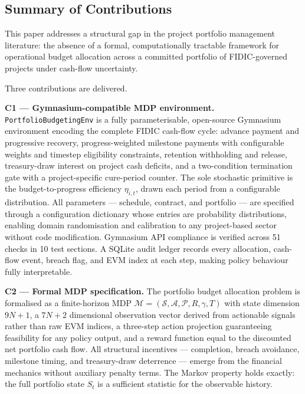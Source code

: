 \subsection{Summary of Contributions}
\label{subsec:summary}

This paper addresses a structural gap in the project portfolio
management literature: the absence of a formal, computationally
tractable framework for operational budget allocation across a
committed portfolio of FIDIC-governed projects under cash-flow
uncertainty.

Three contributions are delivered.

\textbf{C1 --- Gymnasium-compatible MDP environment.}
\texttt{PortfolioBudgetingEnv} is a fully parameterisable, open-source
Gymnasium environment encoding the complete FIDIC cash-flow cycle:
advance payment and progressive recovery, progress-weighted milestone
payments with configurable weights and timestep eligibility
constraints, retention withholding and release, treasury-draw interest
on project cash deficits, and a two-condition termination gate with a
project-specific cure-period counter. The sole stochastic primitive is
the budget-to-progress efficiency $\eta_{i,t}$, drawn each period from
a configurable distribution. All parameters --- schedule, contract,
and portfolio --- are specified through a configuration dictionary
whose entries are probability distributions, enabling domain
randomisation and calibration to any project-based sector without
code modification. Gymnasium API compliance is verified across 51
checks in 10 test sections. A SQLite audit ledger records every
allocation, cash-flow event, breach flag, and EVM index at each step,
making policy behaviour fully interpretable.

\textbf{C2 --- Formal MDP specification.}
The portfolio budget allocation problem is formalised as a
finite-horizon MDP $\mathcal{M} = (\mathcal{S}, \mathcal{A},
\mathcal{P}, R, \gamma, T)$ with state dimension $9N + 1$, a
$7N + 2$ dimensional observation vector derived from actionable
signals rather than raw EVM indices, a three-step action projection
guaranteeing feasibility for any policy output, and a reward function
equal to the discounted net portfolio cash flow. All structural
incentives --- completion, breach avoidance, milestone timing, and
treasury-draw deterrence --- emerge from the financial mechanics
without auxiliary penalty terms. The Markov property holds exactly:
the full portfolio state $S_t$ is a sufficient statistic for the
observable history.

